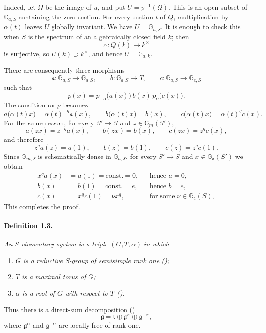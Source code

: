 Indeed, let \(\Omega\) be the image of \(u\), and put
\(U=p^{-1}(\Omega)\). This is an open subset of
\(\mathbb G_{a,S}\) containing the zero section. For every section
\(t\) of \(Q\), multiplication by \(\alpha(t)\) leaves \(U\)
globally invariant. We have \(U=\mathbb G_{a,S}\). It is enough to
check this when \(S\) is the spectrum of an algebraically closed
field \(k\); then
\[
  \alpha\colon Q(k)\longrightarrow k^\times
\]
is surjective, so \(U(k)\supset k^\times\), and hence
\(U=\mathbb G_{a,k}\).

There are consequently three morphisms
\[
  a\colon\mathbb G_{a,S}\longrightarrow\mathbb G_{a,S},
  \qquad
  b\colon\mathbb G_{a,S}\longrightarrow T,
  \qquad
  c\colon\mathbb G_{a,S}\longrightarrow\mathbb G_{a,S}
\]
such that
\[
  p(x)=p_{-\alpha}\bigl(a(x)\bigr)\,b(x)\,
       p_\alpha\bigl(c(x)\bigr).
\]
The condition on \(p\) becomes
\[
  a\bigl(\alpha(t)x\bigr)=\alpha(t)^{-q}a(x),\qquad
  b\bigl(\alpha(t)x\bigr)=b(x),\qquad
  c\bigl(\alpha(t)x\bigr)=\alpha(t)^q c(x).
\]
For the same reason, for every \(S'\to S\) and
\(z\in\mathbb G_m(S')\),
\[
  a(zx)=z^{-q}a(x),\qquad b(zx)=b(x),\qquad c(zx)=z^q c(x),
\]
and therefore
\[
  z^q a(z)=a(1),\qquad b(z)=b(1),\qquad c(z)=z^q c(1).
\]
Since \(\mathbb G_{m,S}\) is schematically dense in
\(\mathbb G_{a,S}\), for every \(S'\to S\) and
\(x\in\mathbb G_a(S')\) we obtain
\[
\begin{aligned}
  x^q a(x)&=a(1)=\text{const.}=0, &&\text{hence }a=0,\\
  b(x)&=b(1)=\text{const.}=e, &&\text{hence }b=e,\\
  c(x)&=x^q c(1)=\nu x^q,
    &&\text{for some }\nu\in\mathbb G_a(S),
\end{aligned}
\]
This completes the proof.

\paragraph{\textbf{Definition 1.3.}}
\emph{An \(S\)-elementary system is a triple \((G,T,\alpha)\) in
which}
\begin{enumerate}
\item[\textup{(i)}] \emph{\(G\) is a reductive \(S\)-group of
  semisimple rank one \textup{()};}
\item[\textup{(ii)}] \emph{\(T\) is a maximal torus of \(G\);}
\item[\textup{(iii)}] \emph{\(\alpha\) is a root of \(G\) with
  respect to \(T\) \textup{()}.}
\end{enumerate}
Thus there is a direct-sum decomposition
\textup{()}
\[
  \mathfrak g=\mathfrak t\oplus\mathfrak g^\alpha
  \oplus\mathfrak g^{-\alpha},
\]
where \(\mathfrak g^\alpha\) and \(\mathfrak g^{-\alpha}\) are
locally free of rank one.

